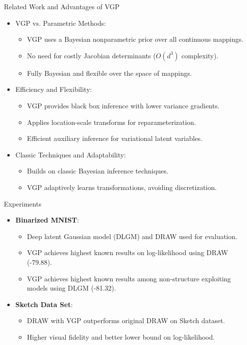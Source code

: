 \documentclass{beamer}
\begin{document}
\begin{frame}{Related Work and Advantages of VGP}
    \begin{itemize}
        \item VGP vs. Parametric Methods:
        \begin{itemize}
            \item VGP uses a Bayesian nonparametric prior over all continuous mappings.
            \item No need for costly Jacobian determinants ($O(d^3)$ complexity).
            \item Fully Bayesian and flexible over the space of mappings.
        \end{itemize}
        \item Efficiency and Flexibility:
        \begin{itemize}
            \item VGP provides black box inference with lower variance gradients.
            \item Applies location-scale transforms for reparameterization.
            \item Efficient auxiliary inference for variational latent variables.
        \end{itemize}
        \item Classic Techniques and Adaptability:
        \begin{itemize}
            \item Builds on classic Bayesian inference techniques.
            \item VGP adaptively learns transformations, avoiding discretization.
        \end{itemize}
    \end{itemize}
\end{frame}

\begin{frame}{Experiments}
    \begin{itemize}
        \item \textbf{Binarized MNIST}: 
            \begin{itemize}
                \item Deep latent Gaussian model (DLGM) and DRAW used for evaluation.
                \item VGP achieves highest known results on log-likelihood using DRAW (-79.88).
                \item VGP achieves highest known results among non-structure exploiting models using DLGM (-81.32).
            \end{itemize}
        \item \textbf{Sketch Data Set}: 
            \begin{itemize}
                \item DRAW with VGP outperforms original DRAW on Sketch dataset.
                \item Higher visual fidelity and better lower bound on log-likelihood.
            \end{itemize}
    \end{itemize}
    
\end{frame}
\end{document}
